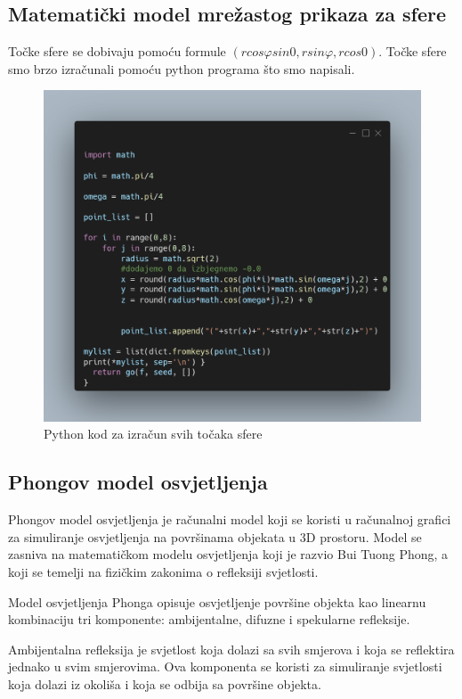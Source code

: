 \documentclass[a4paper,12pt]{article}
\begin{document}
\clearpage
\subsection{Matematički model mrežastog prikaza za sfere}
Točke sfere se dobivaju pomoću formule $(r cos \varphi sin 0, rsin\varphi, rcos 0)$. Točke sfere smo brzo izračunali pomoću python programa što smo napisali.
\begin{figure}[ht]
    \centering
    \includegraphics[scale=0.25]{image/python.png}
    \caption{Python kod za izračun svih točaka sfere}
    
\end{figure}

\newpage
\subsection{Phongov model osvjetljenja}
Phongov model osvjetljenja je računalni model koji se koristi u računalnoj grafici za simuliranje osvjetljenja na površinama objekata u 3D prostoru. Model se zasniva na matematičkom modelu osvjetljenja koji je razvio Bui Tuong Phong, a koji se temelji na fizičkim zakonima o refleksiji svjetlosti.

Model osvjetljenja Phonga opisuje osvjetljenje površine objekta kao linearnu kombinaciju tri komponente: ambijentalne, difuzne i spekularne refleksije.

Ambijentalna refleksija je svjetlost koja dolazi sa svih smjerova i koja se reflektira jednako u svim smjerovima. Ova komponenta se koristi za simuliranje svjetlosti koja dolazi iz okoliša i koja se odbija sa površine objekta.
\end{document}
